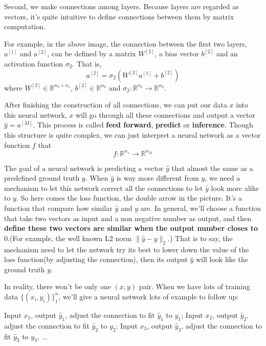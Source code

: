 \documentclass[../main.tex]{subfiles}
\begin{document}
            Second, we make connections among layers.
            Because layers are regarded as vectors, it's quite intuitive to define connections between them by matrix computation.
             
            For example, in the above image, the connection between the first two layers, $a^{[1]}$ and $a^{[2]}$, can be defined by a matrix $W^{[2]}$, a bias vector $b^{[2]}$ and an activation function $\sigma_2$. That is,
            \[
                a^{[2]} = \sigma_2(W^{[2]} a^{[1]} + b^{[2]})
            \]
            where $W^{[2]} \in \mathbb{R}^{n_2 \times n_1}$, $b^{[2]} \in \mathbb{R}^{n_2}$ and $\sigma_2: \mathbb{R}^{n_2} \rightarrow \mathbb{R}^{n_2}$.
            
            After finishing the construction of all connections, we can put our data $x$ into this neural network, $x$ will go through all these connections and output a vector $\hat{y}=a^{[M]}$.
            This process is called \textbf{feed forward}, \textbf{predict} or \textbf{inference}. Though this structure is quite complex, we can just interpret a neural network as a vector function $f$ that
            \[ 
                f:\mathbb{R}^{n_1} \rightarrow \mathbb{R}^{n_M}
            \]
            
            The goal of a neural network is predicting a vector $\hat{y}$ that almost the same as a predefined ground truth $y$.
            When $\hat{y}$ is way more different from $y$, we need a mechanism to let this network correct all the connections to let $\hat{y}$ look more alike to $y$.
            So here comes the loss function, the double arrow in the picture. It's a function that compare how similar $\hat{y}$ and $y$ are.
            In general, we'll choose a function that take two vectors as input and a non negative number as output, and then \textbf{define these two vectors are similar when the output number closes to} $0$.(For example, the well known L2 norm $\|\hat{y} - y\|_2$.)
            That is to say, the mechanism need to let the network try its best to lower down the value of the loss function(by adjusting the connection), then its output $\hat{y}$ will look like the ground truth $y$. 
            
            In reality, there won't be only one $(x, y)$ pair. When we have lots of training data $\{(x_i, y_i)\}_1^n$, we'll give a neural network lots of example to follow up: 
            \begin{displayquote}
                Input $x_1$, output $\hat{y}_1$, adjust the connection to fit $\hat{y}_1$ to $y_1$; Input $x_2$, output $\hat{y}_2$, adjust the connection to fit $\hat{y}_2$ to $y_2$; Input $x_3$, output $\hat{y}_3$, adjust the connection to fit $\hat{y}_3$ to $y_3$, ...
            \end{displayquote}
            
\end{document}
